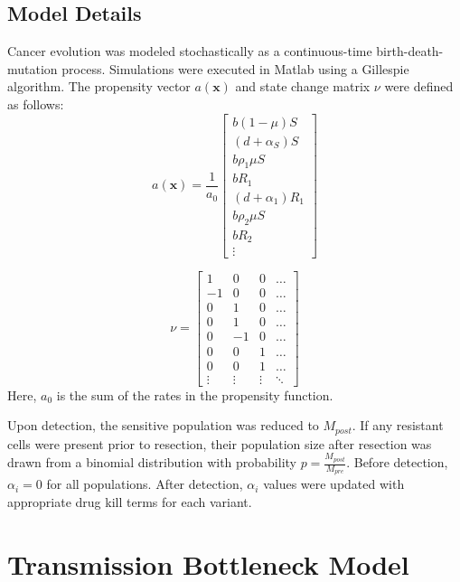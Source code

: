 \documentclass{article}
\begin{document}
\subsection{Model Details}
Cancer evolution was modeled stochastically as a continuous-time birth-death-mutation process.  Simulations were executed in Matlab using a Gillespie algorithm.  The propensity vector $a(\mathbf{x})$ and state change matrix $\nu$ were defined as follows:
\begin{equation}
a(\mathbf{x}) = \frac{1}{a_0}
\begin{bmatrix}
b (1-\mu) S \\
(d+\alpha_S) S \\
b \rho_1 \mu S \\
b R_1 \\
(d + \alpha_1) R_1 \\
b \rho_2 \mu S \\
b R_2 \\
\vdots
\end{bmatrix}
\end{equation}

\begin{equation}
\nu = 
\begin{bmatrix}
1 & 0 & 0 & \dots \\
-1 & 0 & 0 & \dots \\
0 & 1 & 0 & \dots \\
0 & 1 & 0 & \dots \\
0 & -1 & 0 & \dots \\
0 & 0 & 1 & \dots \\
0 & 0 & 1 & \dots \\
\vdots & \vdots & \vdots & \ddots
\end{bmatrix}
\end{equation}
Here, $a_0$ is the sum of the rates in the propensity function.

Upon detection, the sensitive population was reduced to $M_{post}$.  If any resistant cells were present prior to resection, their population size after resection was drawn from a binomial distribution with probability $p=\frac{M_{post}}{M_{pre}}$.  Before detection, $\alpha_i = 0$ for all populations.  After detection, $\alpha_i$ values were updated with appropriate drug kill terms for each variant.

\section{Transmission Bottleneck Model}
\end{document}
